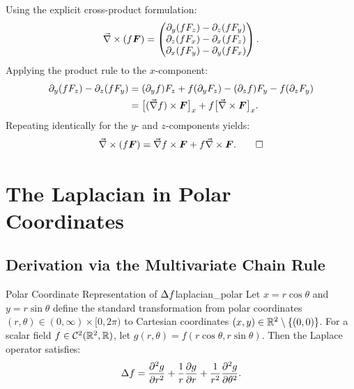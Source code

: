 \begin{demonstration}
Using the explicit cross-product formulation:
\begin{equation*}
    \vec{\nabla}\times (f \bm{F}) = \begin{pmatrix} 
        \partial_y(f F_z) - \partial_z(f F_y) \\ 
        \partial_z(f F_x) - \partial_x(f F_z) \\ 
        \partial_x(f F_y) - \partial_y(f F_x) 
    \end{pmatrix}.
\end{equation*}
Applying the product rule to the $x$-component:
\begin{align*}
    \partial_y(f F_z) - \partial_z(f F_y) &= (\partial_y f) F_z + f (\partial_y F_z) - (\partial_z f) F_y - f (\partial_z F_y) \\
    &= \bigl[(\vec{\nabla} f) \times \bm{F}\bigr]_x + f \bigl[\vec{\nabla}\times \bm{F}\bigr]_x.
\end{align*}
Repeating identically for the $y$- and $z$-components yields:
\begin{equation*}
    \vec{\nabla}\times(f \bm{F}) = \vec{\nabla} f \times \bm{F} + f \vec{\nabla}\times \bm{F}. \qedhere
\end{equation*}
\end{demonstration}

\section{The Laplacian in Polar Coordinates}

\subsection{Derivation via the Multivariate Chain Rule}
\begin{theoreme}{Polar Coordinate Representation of $\Delta f$}{laplacian_polar}
Let $x = r \cos\theta$ and $y = r \sin\theta$ define the standard transformation from polar coordinates $(r, \theta) \in (0, \infty) \times [0, 2\pi)$ to Cartesian coordinates $(x, y) \in \mathbb{R}^2 \setminus \{(0,0)\}$. For a scalar field $f \in \mathcal{C}^2(\mathbb{R}^2, \mathbb{R})$, let $g(r, \theta) = f(r \cos\theta, r \sin\theta)$. Then the Laplace operator satisfies:
\begin{equation}
    \laplacian f = \pdv[2]{g}{r} + \frac{1}{r}\pdv{g}{r} + \frac{1}{r^2}\pdv[2]{g}{\theta}.
\end{equation}
\end{theoreme}

